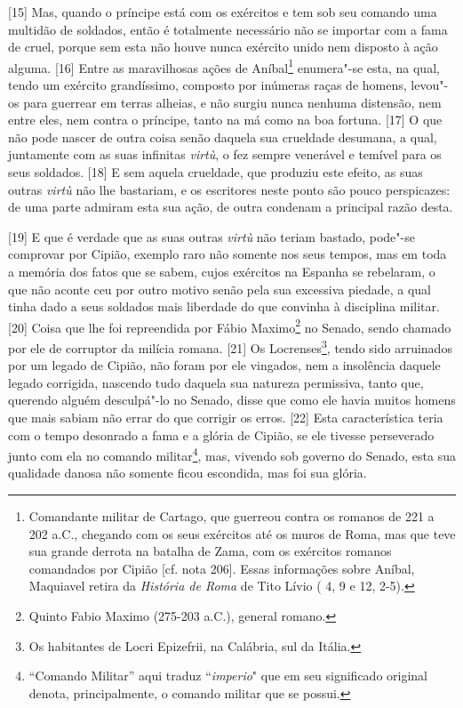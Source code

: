 {[}15{]} Mas, quando o príncipe está com os exércitos e tem sob seu
comando uma multidão de soldados, então é totalmente necessário não se
importar com a fama de cruel, porque sem esta não houve nunca exército
unido nem disposto à ação alguma. {[}16{]} Entre as maravilhosas ações
de Aníbal\footnote{Comandante militar de Cartago, que guerreou contra os
  romanos de 221 a 202 a.C., chegando com os seus exércitos até os muros
  de Roma, mas que teve sua grande derrota na batalha de Zama, com os
  exércitos romanos comandados por Cipião {[}cf. nota 206{]}. Essas
  informações sobre Aníbal, Maquiavel retira da \emph{História de Roma}
  de Tito Lívio ( 4, 9 e  12, 2-5).} enumera"-se esta, na qual,
tendo um exército grandíssimo, composto por inúmeras raças de homens,
levou"-os para guerrear em terras alheias, e não surgiu nunca nenhuma
distensão, nem entre eles, nem contra o príncipe, tanto na má como na
boa fortuna. {[}17{]} O que não pode nascer de outra coisa senão daquela
sua crueldade desumana, a qual, juntamente com as suas infinitas
\emph{virtù}, o fez sempre venerável e temível para os seus soldados.
{[}18{]} E sem aquela crueldade, que produziu este efeito, as suas
outras \emph{virtù} não lhe bastariam, e os escritores neste ponto são
pouco perspicazes: de uma parte admiram esta sua ação, de outra condenam
a principal razão desta.

{[}19{]} E que é verdade que as suas outras \emph{virtù} não teriam
bastado, pode"-se comprovar por Cipião, exemplo raro não somente nos seus
tempos, mas em toda a memória dos fatos que se sabem, cujos exércitos na
Espanha se rebelaram, o que não aconte ceu por outro motivo senão pela
sua excessiva piedade, a qual tinha dado a seus soldados mais liberdade
do que convinha à disciplina militar. {[}20{]} Coisa que lhe foi
repreendida por Fábio Maximo\footnote{Quinto Fabio Maximo (275-203
  a.C.), general romano.} no Senado, sendo chamado por ele de corruptor
da milícia romana. {[}21{]} Os Locrenses\footnote{Os habitantes de Locri
  Epizefrii, na Calábria, sul da Itália.}, tendo sido arruinados por um
legado de Cipião, não foram por ele vingados, nem a insolência daquele
legado corrigida, nascendo tudo daquela sua natureza permissiva, tanto
que, querendo alguém desculpá"-lo no Senado, disse que como ele havia
muitos homens que mais sabiam não errar do que corrigir os erros.
{[}22{]} Esta característica teria com o tempo desonrado a fama e a
glória de Cipião, se ele tivesse perseverado junto com ela no comando
militar\footnote{``Comando Militar'' aqui traduz ``\emph{imperio}" que
  em seu significado original denota, principalmente, o comando militar
  que se possui.}, mas, vivendo sob governo do Senado, esta sua
qualidade danosa não somente ficou escondida, mas foi sua glória.


